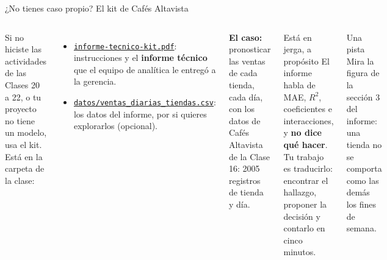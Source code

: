 \documentclass[aspectratio=169,11pt]{beamer}
\newcommand{\urlkit}{https://github.com/craljimenez/An-lisis_y_Visualizacion_de_Datos_para_la_Toma_de_Decisiones/blob/main/clases/semana12-clase23-clinica-analitica-storytelling/informe-tecnico-kit.pdf}
\newcommand{\urlkitdatos}{https://github.com/craljimenez/An-lisis_y_Visualizacion_de_Datos_para_la_Toma_de_Decisiones/raw/main/clases/semana12-clase23-clinica-analitica-storytelling/datos/ventas_diarias_tiendas.csv}
\begin{document}
\begin{frame}[t]{¿No tienes caso propio? El kit de Cafés Altavista}
  \begin{columns}[T,onlytextwidth]
    \small Si no hiciste las actividades de las Clases 20 a 22, o tu proyecto
    no tiene un modelo, usa el kit. Está en la carpeta de la clase:
    \vspace{0.05cm}
    \begin{itemize}
      \footnotesize
      \item \href{\urlkit}{\color{esumerOrange}\texttt{informe-tecnico-kit.pdf}}:
        instrucciones y el \textbf{informe técnico} que el equipo de
        analítica le entregó a la gerencia.
      \item \href{\urlkitdatos}{\color{esumerOrange}\texttt{datos/ventas\_diarias\_tiendas.csv}}:
        los datos del informe, por si quieres explorarlos (opcional).
    \end{itemize}
    \vspace{0.05cm}
    \footnotesize\textbf{El caso:} pronosticar las ventas de cada tienda,
    cada día, con los datos de Cafés Altavista de la Clase 16: 2005
    registros de tienda y día.
    \begin{alertblock}{Está en jerga, a propósito}
      \footnotesize El informe habla de MAE, $R^2$, coeficientes e
      interacciones, y \textbf{no dice qué hacer}. Tu trabajo es
      traducirlo: encontrar el hallazgo, proponer la decisión y contarlo en
      cinco minutos.
    \end{alertblock}
    \begin{block}{Una pista}
      \footnotesize Mira la figura de la sección 3 del informe: una tienda
      no se comporta como las demás los fines de semana.
    \end{block}
  \end{columns}
\end{frame}
\end{document}
